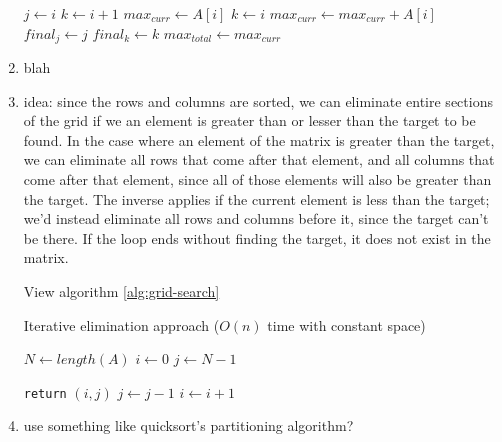 \documentclass[12pt]{article}
\begin{document}
\begin{enumerate}
\begin{algorithm}
\begin{algorithmic}
                    \State $j \gets i$
                    \State $k \gets i + 1$
                    \State $max_{curr} \gets A[i]$
                \Else
                    \State $k \gets i$
                    \State $max_{curr} \gets max_{curr} + A[i]$
                    \State $final_j \gets j$
                    \State $final_k \gets k$
                    \State $max_{total} \gets max_{curr}$
        \end{algorithmic}
    \end{algorithm}
    
    \item blah
    \item idea: since the rows and columns are sorted, we can eliminate entire sections of the grid if we an element is greater than or lesser than the target to be found. In the case where an element of the matrix is greater than the target, we can eliminate all rows that come after that element, and all columns that come after that element, since all of those elements will also be greater than the target. The inverse applies if the current element is less than the target; we'd instead eliminate all rows and columns before it, since the target can't be there. If the loop ends without finding the target, it does not exist in the matrix.
    
    View algorithm \ref{alg:grid-search}
    
    \begin{algorithm}
        \caption{Iterative elimination approach ($O(n)$ time with constant space)}
        \label{alg:grid-search}
        \begin{algorithmic}[1]
            \State $N \gets length(A)$
            \State $i \gets 0$
            \State $j \gets N - 1$
            
                    \State \texttt{return} $(i, j)$
                \Else
                        \State $j \gets j - 1$
                    \Else
                        \State $i \gets i + 1$
        \end{algorithmic}
    \end{algorithm}
    
    \item use something like quicksort's partitioning algorithm?
\end{enumerate}
\end{document}
